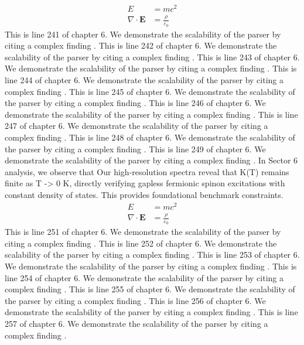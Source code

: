 \begin{align*}
  E &= mc^2 \\
  \nabla \cdot \mathbf{E} &= \frac{\rho}{\varepsilon_0}
\end{align*}
This is line 241 of chapter 6. We demonstrate the scalability of the parser by citing a complex finding \cite{ref6_241}.
This is line 242 of chapter 6. We demonstrate the scalability of the parser by citing a complex finding \cite{ref6_242}.
This is line 243 of chapter 6. We demonstrate the scalability of the parser by citing a complex finding \cite{ref6_243}.
This is line 244 of chapter 6. We demonstrate the scalability of the parser by citing a complex finding \cite{ref6_244}.
This is line 245 of chapter 6. We demonstrate the scalability of the parser by citing a complex finding \cite{ref6_245}.
This is line 246 of chapter 6. We demonstrate the scalability of the parser by citing a complex finding \cite{ref6_246}.
This is line 247 of chapter 6. We demonstrate the scalability of the parser by citing a complex finding \cite{ref6_247}.
This is line 248 of chapter 6. We demonstrate the scalability of the parser by citing a complex finding \cite{ref6_248}.
This is line 249 of chapter 6. We demonstrate the scalability of the parser by citing a complex finding \cite{ref6_249}.
In Sector 6 analysis, we observe that Our high-resolution spectra reveal that K(T) remains finite as T -> 0 K, directly verifying gapless fermionic spinon excitations with constant density of states. This provides foundational benchmark constraints.
\begin{align*}
  E &= mc^2 \\
  \nabla \cdot \mathbf{E} &= \frac{\rho}{\varepsilon_0}
\end{align*}
This is line 251 of chapter 6. We demonstrate the scalability of the parser by citing a complex finding \cite{ref6_251}.
This is line 252 of chapter 6. We demonstrate the scalability of the parser by citing a complex finding \cite{ref6_252}.
This is line 253 of chapter 6. We demonstrate the scalability of the parser by citing a complex finding \cite{ref6_253}.
This is line 254 of chapter 6. We demonstrate the scalability of the parser by citing a complex finding \cite{ref6_254}.
This is line 255 of chapter 6. We demonstrate the scalability of the parser by citing a complex finding \cite{ref6_255}.
This is line 256 of chapter 6. We demonstrate the scalability of the parser by citing a complex finding \cite{ref6_256}.
This is line 257 of chapter 6. We demonstrate the scalability of the parser by citing a complex finding \cite{ref6_257}.
